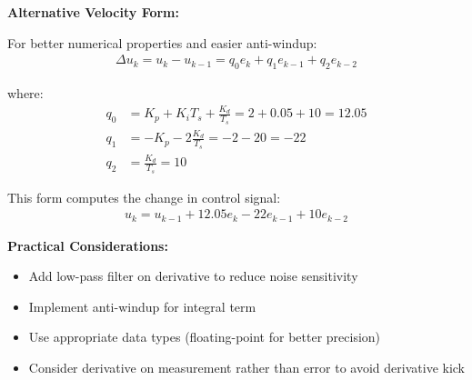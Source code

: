 \documentclass[11pt,a4paper]{article}
\begin{document}
\textbf{Alternative Velocity Form:}

For better numerical properties and easier anti-windup:
\begin{align}
  \Delta u_k = u_k - u_{k-1} = q_0 e_k + q_1 e_{k-1} + q_2 e_{k-2}
\end{align}

where:
\begin{align}
  q_0 &= K_p + K_i T_s + \frac{K_d}{T_s} = 2 + 0.05 + 10 = 12.05 \\
  q_1 &= -K_p - 2\frac{K_d}{T_s} = -2 - 20 = -22 \\
  q_2 &= \frac{K_d}{T_s} = 10
\end{align}

This form computes the change in control signal:
\begin{align}
  u_k = u_{k-1} + 12.05e_k - 22e_{k-1} + 10e_{k-2}
\end{align}

\textbf{Practical Considerations:}
\begin{itemize}
  \item Add low-pass filter on derivative to reduce noise sensitivity
  \item Implement anti-windup for integral term
  \item Use appropriate data types (floating-point for better precision)
  \item Consider derivative on measurement rather than error to avoid derivative kick
\end{itemize}
\end{document}
